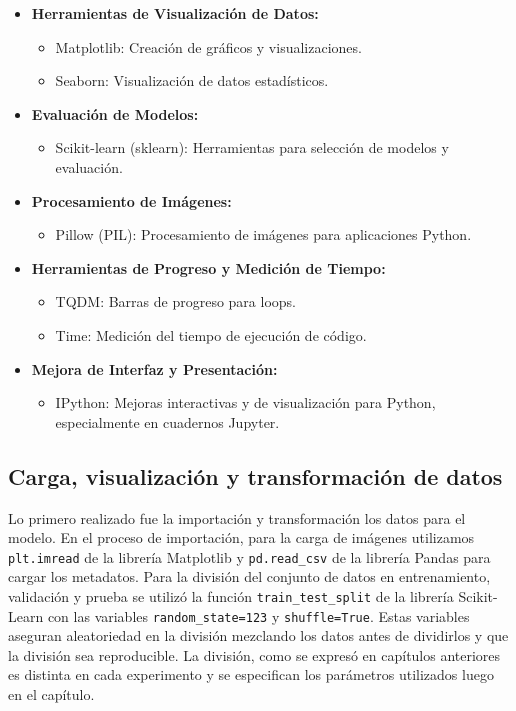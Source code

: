 \begin{itemize}
   \item \textbf{Herramientas de Visualización de Datos:}
   \begin{itemize}
       \item Matplotlib: Creación de gráficos y visualizaciones.
       \item Seaborn: Visualización de datos estadísticos.
   \end{itemize}

   \item \textbf{Evaluación de Modelos:}
   \begin{itemize}
       \item Scikit-learn (sklearn): Herramientas para selección de modelos y evaluación.
   \end{itemize}

   \item \textbf{Procesamiento de Imágenes:}
   \begin{itemize}
       \item Pillow (PIL): Procesamiento de imágenes para aplicaciones Python.
   \end{itemize}

   \item \textbf{Herramientas de Progreso y Medición de Tiempo:}
   \begin{itemize}
       \item TQDM: Barras de progreso para loops.
       \item Time: Medición del tiempo de ejecución de código.
   \end{itemize}

   \item \textbf{Mejora de Interfaz y Presentación:}
   \begin{itemize}
       \item IPython: Mejoras interactivas y de visualización para Python, especialmente en cuadernos Jupyter.
   \end{itemize}
\end{itemize}


\subsection*{Carga, visualización y transformación de datos}

Lo primero realizado fue la importación y transformación los datos para el modelo. En el proceso de importación, para la carga de imágenes utilizamos \texttt{plt.imread} de la librería Matplotlib y \texttt{pd.read\_csv} de la librería Pandas para cargar los metadatos. Para la división del conjunto de datos en entrenamiento, validación y prueba se utilizó la función \texttt{train\_test\_split} de la librería Scikit-Learn con las variables \texttt{random\_state=123} y \texttt{shuffle=True}. Estas variables aseguran aleatoriedad en la división mezclando los datos antes de dividirlos y que la división sea reproducible. La división, como se expresó en capítulos anteriores es distinta en cada experimento y se especifican los parámetros utilizados luego en el capítulo.

